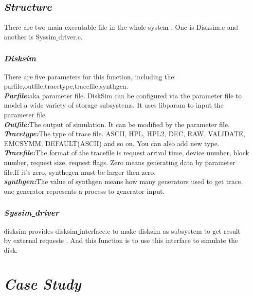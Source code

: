 \documentclass[conference]{IEEEtran}
\begin{document}
\subsection{\emph{\textbf{Structure}}}
There are two main executable file in the whole system . One is Disksim.c and another is Syssim\underline{ }driver.c.
\subsubsection{\emph{\textbf{Disksim}}}
There are five parameters for this function, including the: parfile,outfile,tracetype,tracefile,synthgen.\\
\textbf{\emph{Parfile:}}aka parameter file. DiskSim can be configured via the parameter file to model a wide variety of storage subsystems. It uses libparam to input the parameter file.\\
\textbf{\emph{Outfile:}}The output of simulation. It can be modified by the parameter file.\\
\textbf{\emph{Tracetype:}}The type of trace file. ASCII, HPL, HPL2, DEC, RAW, VALIDATE, EMCSYMM, DEFAULT(ASCII) and so on. You can also add new type.\\
\textbf{\emph{Tracefile:}}The format of the tracefile is request arrival time, device number, block number, request size, request flags. Zero means generating data by parameter file.If it's zero, synthegen must be larger then zero.\\
\textbf{\emph{synthgen:}}The value of synthgen means how many generators used to get trace, one generator represents a process to generator input.\\


\subsubsection{\emph{\textbf{Syssim\underline{ }driver}}}
\begin{flushleft}
\quad
disksim provides disksim\underline{ }interface.c to make disksim as  subsystem to get result by external requests . And this function is to use this interface to simulate the disk.
\end{flushleft}

\section{\emph{\textbf{Case Study}}}
\end{document}
